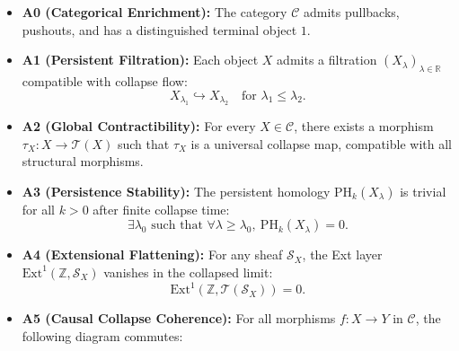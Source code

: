 \documentclass[11pt]{article}
\begin{document}
\begin{itemize}
    \item \textbf{A0 (Categorical Enrichment):} The category $\mathcal{C}$ admits pullbacks, pushouts, and has a distinguished terminal object $1$.

    \item \textbf{A1 (Persistent Filtration):} Each object $X$ admits a filtration $(X_\lambda)_{\lambda \in \mathbb{R}}$ compatible with collapse flow:
    \[
    X_{\lambda_1} \hookrightarrow X_{\lambda_2} \quad \text{for } \lambda_1 \leq \lambda_2.
    \]

    \item \textbf{A2 (Global Contractibility):} For every $X \in \mathcal{C}$, there exists a morphism $\tau_X : X \rightarrow \mathcal{T}(X)$  
    such that $\tau_X$ is a universal collapse map, compatible with all structural morphisms.

    \item \textbf{A3 (Persistence Stability):} The persistent homology $\mathrm{PH}_k(X_\lambda)$ is trivial for all $k > 0$ after finite collapse time:
    \[
    \exists \lambda_0 \text{ such that } \forall \lambda \geq \lambda_0,\ \mathrm{PH}_k(X_\lambda) = 0.
    \]

    \item \textbf{A4 (Extensional Flattening):} For any sheaf $\mathcal{S}_X$, the Ext layer $\mathrm{Ext}^1(\mathbb{Z}, \mathcal{S}_X)$  
    vanishes in the collapsed limit:
    \[
    \mathrm{Ext}^1(\mathbb{Z}, \mathcal{T}(\mathcal{S}_X)) = 0.
    \]

    \item \textbf{A5 (Causal Collapse Coherence):} For all morphisms $f: X \rightarrow Y$ in $\mathcal{C}$, the following diagram commutes:
　　\begin{center}
　　\end{center}



\end{itemize}
\end{document}
